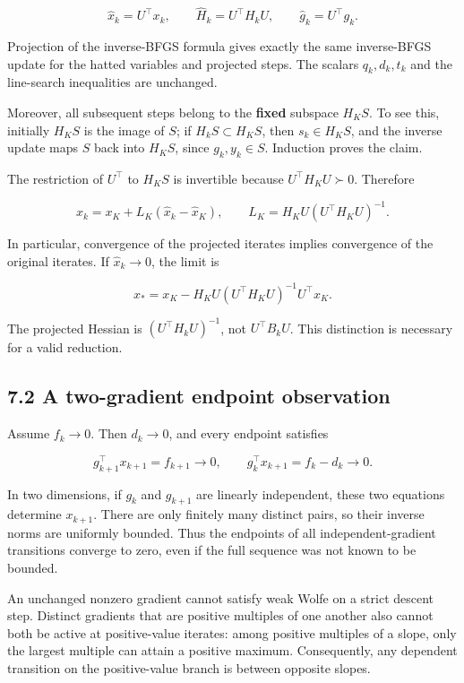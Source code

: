\[
\widehat x_k=U^\top x_k,\qquad
\widehat H_k=U^\top H_kU,\qquad
\widehat g_k=U^\top g_k.
\]

Projection of the inverse-BFGS formula gives exactly the same
inverse-BFGS update for the hatted variables and projected steps. The
scalars \(q_k,d_k,t_k\) and the line-search inequalities are unchanged.

Moreover, all subsequent steps belong to the \textbf{fixed} subspace
\(H_KS\). To see this, initially \(H_KS\) is the image of \(S\); if
\(H_kS\subset H_KS\), then \(s_k\in H_KS\), and the inverse update maps
\(S\) back into \(H_KS\), since \(g_k,y_k\in S\). Induction proves the
claim.

The restriction of \(U^\top\) to \(H_KS\) is invertible because
\(U^\top H_KU\succ0\). Therefore

\[
\boxed{
x_k=x_K+L_K(\widehat x_k-\widehat x_K),\qquad
L_K=H_KU(U^\top H_KU)^{-1}.
}
\tag{H.7.1}
\]

In particular, convergence of the projected iterates implies convergence
of the original iterates. If \(\widehat x_k\to0\), the limit is

\[
\boxed{x_*=x_K-H_KU(U^\top H_KU)^{-1}U^\top x_K.}
\tag{H.7.2}
\]

The projected Hessian is \((U^\top H_kU)^{-1}\), not \(U^\top B_kU\).
This distinction is necessary for a valid reduction.

\subsection{7.2 A two-gradient endpoint
observation}\label{H:a-two-gradient-endpoint-observation}

Assume \(f_k\to0\). Then \(d_k\to0\), and every endpoint satisfies

\[
g_{k+1}^\top x_{k+1}=f_{k+1}\longrightarrow0,
\qquad
g_k^\top x_{k+1}=f_k-d_k\longrightarrow0.
\tag{H.7.3}
\]

In two dimensions, if \(g_k\) and \(g_{k+1}\) are linearly independent,
these two equations determine \(x_{k+1}\). There are only finitely many
distinct pairs, so their inverse norms are uniformly bounded. Thus the
endpoints of all independent-gradient transitions converge to zero, even
if the full sequence was not known to be bounded.

An unchanged nonzero gradient cannot satisfy weak Wolfe on a strict
descent step. Distinct gradients that are positive multiples of one
another also cannot both be active at positive-value iterates: among
positive multiples of a slope, only the largest multiple can attain a
positive maximum. Consequently, any dependent transition on the
positive-value branch is between opposite slopes.

